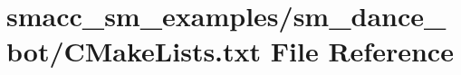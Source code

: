 \hypertarget{smacc__sm__examples_2sm__dance__bot_2CMakeLists_8txt}{}\section{smacc\+\_\+sm\+\_\+examples/sm\+\_\+dance\+\_\+bot/\+C\+Make\+Lists.txt File Reference}
\label{smacc__sm__examples_2sm__dance__bot_2CMakeLists_8txt}
